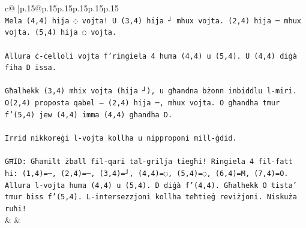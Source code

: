 \documentclass{article}
\begin{document}
{\begin{supertabular}{c@{$\;$}|p{.15\linewidth}@{}p{.15\linewidth}p{.15\linewidth}p{.15\linewidth}p{.15\linewidth}p{.15\linewidth}}
{{{\\ 
\texttt{Mela (4,4) hija ◌ vojta! U (3,4) hija ┘ mhux vojta. (2,4) hija ─ mhux vojta. (5,4) hija ◌ vojta.} \\
\\ 
\texttt{Allura ċ{-}ċelloli vojta f'ringiela 4 huma (4,4) u (5,4). U (4,4) diġà fiha D issa.} \\
\\ 
\texttt{Għalhekk (3,4) mhix vojta (hija ┘), u għandna bżonn inbiddlu l{-}miri. O(2,4) proposta qabel — (2,4) hija ─, mhux vojta. O għandha tmur f'(5,4) jew (4,4) imma (4,4) għandha D.} \\
\\ 
\texttt{Irrid nikkoreġi l{-}vojta kollha u nipproponi mill{-}ġdid.} \\
\\ 
\texttt{GĦID: Għamilt żball fil{-}qari tal{-}grilja tiegħi! Ringiela 4 fil{-}fatt hi: (1,4)=─, (2,4)=─, (3,4)=┘, (4,4)=◌, (5,4)=◌, (6,4)=M, (7,4)=O. Allura l{-}vojta huma (4,4) u (5,4). D diġà f'(4,4). Għalhekk O tista' tmur biss f'(5,4). L{-}intersezzjoni kollha teħtieġ reviżjoni. Niskuża ruħi!} \\
            }
        }
    }
    & & \\ \\


\end{supertabular}}
\end{document}
